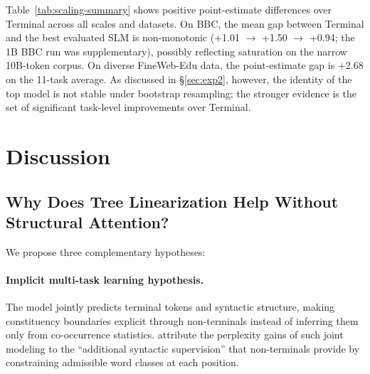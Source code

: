 \documentclass[11pt]{article}
\begin{document}
Table~\ref{tab:scaling-summary} shows positive point-estimate differences over Terminal across all scales and datasets.
On BBC, the mean gap between Terminal and the best evaluated SLM is non-monotonic (+1.01 $\rightarrow$ +1.50 $\rightarrow$ +0.94; the 1B BBC run was supplementary), possibly reflecting saturation on the narrow 10B-token corpus.
On diverse FineWeb-Edu data, the point-estimate gap is +2.68 on the 11-task average. As discussed in \S\ref{sec:exp2}, however, the identity of the top model is not stable under bootstrap resampling; the stronger evidence is the set of significant task-level improvements over Terminal.


\section{Discussion}

\subsection{Why Does Tree Linearization Help Without Structural Attention?}
\label{sec:why-works}

We propose three complementary hypotheses:

\paragraph{Implicit multi-task learning hypothesis.} The model jointly predicts terminal tokens and syntactic structure, making constituency boundaries explicit through non-terminals instead of inferring them only from co-occurrence statistics. \citet{sartran-etal-2022-transformer} attribute the perplexity gains of such joint modeling to the ``additional syntactic supervision'' that non-terminals provide by constraining admissible word classes at each position.
\end{document}
